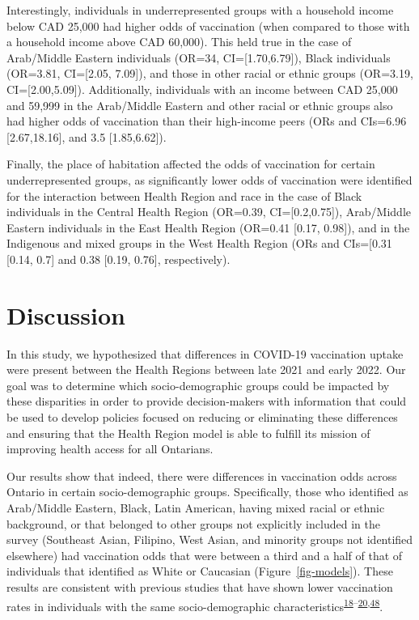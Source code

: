 \documentclass[
]{article}
\begin{document}
Interestingly, individuals in underrepresented groups with a household
income below CAD 25,000 had higher odds of vaccination (when compared to
those with a household income above CAD 60,000). This held true in the
case of Arab/Middle Eastern individuals (OR=34, CI={[}1.70,6.79{]}),
Black individuals (OR=3.81, CI={[}2.05, 7.09{]}), and those in other
racial or ethnic groups (OR=3.19, CI={[}2.00,5.09{]}). Additionally,
individuals with an income between CAD 25,000 and 59,999 in the
Arab/Middle Eastern and other racial or ethnic groups also had higher
odds of vaccination than their high-income peers (ORs and CIs=6.96
{[}2.67,18.16{]}, and 3.5 {[}1.85,6.62{]}).

Finally, the place of habitation affected the odds of vaccination for
certain underrepresented groups, as significantly lower odds of
vaccination were identified for the interaction between Health Region
and race in the case of Black individuals in the Central Health Region
(OR=0.39, CI={[}0.2,0.75{]}), Arab/Middle Eastern individuals in the
East Health Region (OR=0.41 {[}0.17, 0.98{]}), and in the Indigenous and
mixed groups in the West Health Region (ORs and CIs={[}0.31 {[}0.14,
0.7{]} and 0.38 {[}0.19, 0.76{]}, respectively).

\hypertarget{discussion}{%
\section{Discussion}\label{discussion}}

In this study, we hypothesized that differences in COVID-19 vaccination
uptake were present between the Health Regions between late 2021 and
early 2022. Our goal was to determine which socio-demographic groups
could be impacted by these disparities in order to provide
decision-makers with information that could be used to develop policies
focused on reducing or eliminating these differences and ensuring that
the Health Region model is able to fulfill its mission of improving
health access for all Ontarians.

Our results show that indeed, there were differences in vaccination odds
across Ontario in certain socio-demographic groups. Specifically, those
who identified as Arab/Middle Eastern, Black, Latin American, having
mixed racial or ethnic background, or that belonged to other groups not
explicitly included in the survey (Southeast Asian, Filipino, West
Asian, and minority groups not identified elsewhere) had vaccination
odds that were between a third and a half of that of individuals that
identified as White or Caucasian (Figure~\ref{fig-models}). These
results are consistent with previous studies that have shown lower
vaccination rates in individuals with the same socio-demographic
characteristics\textsuperscript{\protect\hyperlink{ref-guay2022}{18}--\protect\hyperlink{ref-hussain2022}{20},\protect\hyperlink{ref-carter2022}{48}}.
\end{document}
